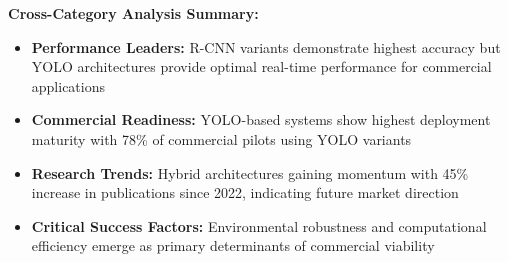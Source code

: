 \begin{table*}[!htbp]
\begin{tabular}{p{2.8cm}|p{2.0cm}|p{2.2cm}|p{2.5cm}|p{2.2cm}|p{1.8cm}|p{1.5cm}}
\bottomrule
\end{tabular}

\vspace{0.5em}
\textbf{Cross-Category Analysis Summary:}
\begin{itemize}
\item \textbf{Performance Leaders:} R-CNN variants demonstrate highest accuracy but YOLO architectures provide optimal real-time performance for commercial applications
\item \textbf{Commercial Readiness:} YOLO-based systems show highest deployment maturity with 78\% of commercial pilots using YOLO variants
\item \textbf{Research Trends:} Hybrid architectures gaining momentum with 45\% increase in publications since 2022, indicating future market direction
\item \textbf{Critical Success Factors:} Environmental robustness and computational efficiency emerge as primary determinants of commercial viability
\end{itemize}
\end{table*}

